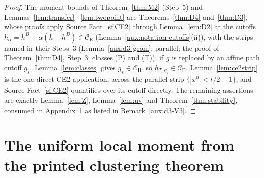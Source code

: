 \documentclass[11pt,a4paper]{article}
\theoremstyle{plain}
\theoremstyle{definition}
\theoremstyle{plain}
\theoremstyle{definition}
\newcommand{\CE}{\mathcal{C}_{\mathrm E}}
\newcommand{\CH}{\mathcal{C}_{\mathrm H}}
\begin{document}
\begin{proof}
The moment bounds of Theorem~\ref{thm:M2} (Step~5) and Lemmas~\ref{lem:transfer}--%
\ref{lem:twopoint} are Theorems~\ref{thm:D4} and~\ref{thm:D3}, whose proofs apply Source
Fact~\ref{sf:CE2} through Lemma~\ref{lem:D2} at the cutoffs $h_\alpha=h^B+\alpha(h-h^B)\in
\CE$ (Lemma~\ref{aux:notation-cutoffs}(ii)), with the strips named in their Steps~3
(Lemma~\ref{aux:d3-geom}: parallel; the proof of Theorem~\ref{thm:D4}, Step~3: classes (P)
and (T)); if $g$ is replaced by an affine path cutoff $g_s$, Lemma~\ref{lem:classes} gives
$g_s\in\CH$, so $h_{T,g_s}\in\CE$.  Lemma~\ref{lem:ce2strip} is the one direct CE2
application, across the parallel strip $\{|x^0|<t/2-1\}$, and Source Fact~\ref{sf:CE2}
quantifies over its cutoff directly.  The remaining assertions are exactly
Lemma~\ref{lem:Z}, Lemma~\ref{lem:uv} and Theorem~\ref{thm:stability}, consumed in
Appendix~\ref{app:comparison} as listed in Remark~\ref{aux:d3-V3}.
\end{proof}


\section{The uniform local moment from the printed clustering theorem}\label{app:comparison}
\renewcommand{\thesubsection}{\thesection.\alph{subsection}}
\renewcommand{\thesubsubsection}{\thesubsection.\arabic{subsubsection}}
\end{document}
